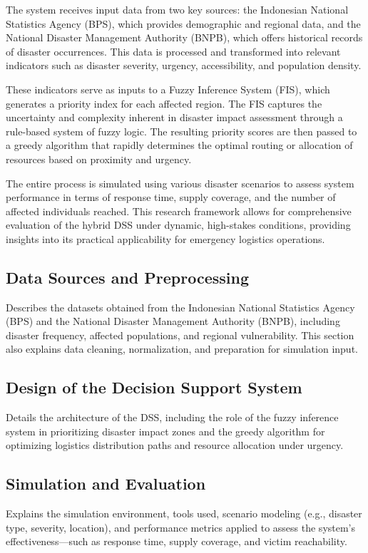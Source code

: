 \documentclass[journal,final,a4paper,twoside,11pt]{IEEEtran}
\begin{document}
The system receives input data from two key sources: the Indonesian National Statistics Agency (BPS), which provides demographic and regional data, and the National Disaster Management Authority (BNPB), which offers historical records of disaster occurrences. This data is processed and transformed into relevant indicators such as disaster severity, urgency, accessibility, and population density.

These indicators serve as inputs to a Fuzzy Inference System (FIS), which generates a priority index for each affected region. The FIS captures the uncertainty and complexity inherent in disaster impact assessment through a rule-based system of fuzzy logic. The resulting priority scores are then passed to a greedy algorithm that rapidly determines the optimal routing or allocation of resources based on proximity and urgency.

The entire process is simulated using various disaster scenarios to assess system performance in terms of response time, supply coverage, and the number of affected individuals reached. This research framework allows for comprehensive evaluation of the hybrid DSS under dynamic, high-stakes conditions, providing insights into its practical applicability for emergency logistics operations.


\subsection{Data Sources and Preprocessing}
Describes the datasets obtained from the Indonesian National Statistics Agency (BPS) and the National Disaster Management Authority (BNPB), including disaster frequency, affected populations, and regional vulnerability. This section also explains data cleaning, normalization, and preparation for simulation input.

\subsection{Design of the Decision Support System}
Details the architecture of the DSS, including the role of the fuzzy inference system in prioritizing disaster impact zones and the greedy algorithm for optimizing logistics distribution paths and resource allocation under urgency.

\subsection{Simulation and Evaluation}
Explains the simulation environment, tools used, scenario modeling (e.g., disaster type, severity, location), and performance metrics applied to assess the system’s effectiveness—such as response time, supply coverage, and victim reachability.
\end{document}
